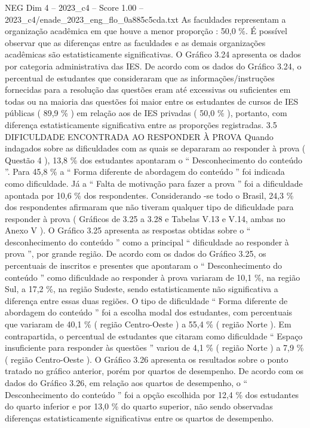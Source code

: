 \begin{textsample}{NEG Dim 4 – 2023\_c4 – Score 1.00 – 2023\_c4/enade\_2023\_eng\_flo\_0a885c5cda.txt}
As faculdades representam a organização acadêmica em que houve a menor proporção : 50,0 \%.
É possível observar que as diferenças entre as faculdades e as demais organizações acadêmicas são estatisticamente significativas.
O Gráfico 3.24 apresenta os dados por categoria administrativa das IES.
De acordo com os dados do Gráfico 3.24, o percentual de estudantes que consideraram que as informações/instruções fornecidas para a resolução das questões eram até excessivas ou suficientes em todas ou na maioria das questões foi maior entre os estudantes de cursos de IES públicas ( 89,9 \% ) em relação aos de IES privadas ( 50,0 \% ), portanto, com diferença estatisticamente significativa entre as proporções registradas. 3.5 DIFICULDADE ENCONTRADA AO RESPONDER À PROVA Quando indagados sobre as dificuldades com as quais se depararam ao responder à prova ( Questão 4 ), 13,8 \% dos estudantes apontaram o “ Desconhecimento do conteúdo ”.
Para 45,8 \% a “ Forma diferente de abordagem do conteúdo ” foi indicada como dificuldade.
Já a “ Falta de motivação para fazer a prova ” foi a dificuldade apontada por 10,6 \% dos respondentes.
Considerando -se todo o Brasil, 24,3 \% dos respondentes afirmaram que não tiveram qualquer tipo de dificuldade para responder à prova ( Gráficos de 3.25 a 3.28 e Tabelas V.13 e V.14, ambas no Anexo V ).
O Gráfico 3.25 apresenta as respostas obtidas sobre o “ desconhecimento do conteúdo ” como a principal “ dificuldade ao responder à prova ”, por grande região.
De acordo com os dados do Gráfico 3.25, os percentuais de inscritos e presentes que apontaram o “ Desconhecimento do conteúdo ” como dificuldade ao responder à prova variaram de 10,1 \%, na região Sul, a 17,2 \%, na região Sudeste, sendo estatisticamente não significativa a diferença entre essas duas regiões.
O tipo de dificuldade “ Forma diferente de abordagem do conteúdo ” foi a escolha modal dos estudantes, com percentuais que variaram de 40,1 \% ( região Centro-Oeste ) a 55,4 \% ( região Norte ).
Em contrapartida, o percentual de estudantes que citaram como dificuldade “ Espaço insuficiente para responder às questões ” variou de 4,1 \% ( região Norte ) a 7,9 \% ( região Centro-Oeste ).
O Gráfico 3.26 apresenta os resultados sobre o ponto tratado no gráfico anterior, porém por quartos de desempenho.
De acordo com os dados do Gráfico 3.26, em relação aos quartos de desempenho, o “ Desconhecimento do conteúdo ” foi a opção escolhida por 12,4 \% dos estudantes do quarto inferior e por 13,0 \% do quarto superior, não sendo observadas diferenças estatisticamente significativas entre os quartos de desempenho.

\end{textsample}
